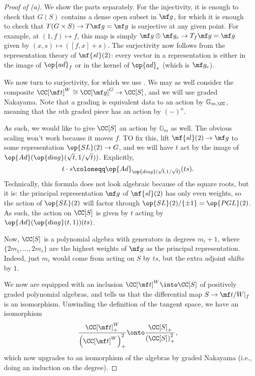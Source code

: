 \documentclass[../notes.tex]{subfiles}
\begin{document}
\begin{proof}[Proof of (a)]
	We show the parts separately. For the injectivity, it is enough to check that $G(S)$ contains a dense open subset in $\mf g$, for which it is enough to check that $T(G\times S)\to T\mf g=\mf g$ is surjective at any given point. For example, at $(1,f)\mapsto f$, this map is simply $\mf g\oplus\mf g_e\to T_f\mf g=\mf g$ given by $(x,s)\mapsto([f,x]+s)$. The surjectivity now follows from the representation theory of $\mf{sl}(2)$: every vector in a representation is either in the image of $\op{ad}_f$ or in the kernel of $\op{ad}_e$ (which is $\mf g_e$).
		
	We now turn to surjectivity, for which we use . We may as well consider the composite $\CC[\mf t]^W\cong\CC[\mf g]^G\to\CC[S]$, and we will use graded Nakayama. Note that a grading is equivalent data to an action by $\mathbb G_{m,\CC}$, meaning that the $n$th graded piece has an action by $(-)^n$.

	As such, we would like to give $\CC[S]$ an action by $\mathbb G_m$ as well. The obvious scaling won't work because it moves $f$. TO fix this, lift $\mf{sl}(2)\to\mf g$ to some representation $\op{SL}(2)\to G$, and we will have $t$ act by the image of $\op{Ad}(\op{diag}(\sqrt t,1/\sqrt t))$. Explicitly,
	\[t\cdot s\coloneqq\op{Ad}_{\op{diag}(\sqrt t,1/\sqrt t)}(ts).\]
	Technically, this formula does not look algebraic because of the square roots, but it is: the principal representation $\mf g$ of $\mf{sl}(2)$ has only even weights, so the action of $\op{SL}(2)$ will factor through $\op{SL}(2)/\{\pm1\}=\op{PGL}(2)$. As such, the action on $\CC[S]$ is given by $t$ acting by $\op{Ad}(\op{diag}(t,1))(ts)$.
	
	Now, $\CC[S]$ is a polynomial algebra with generators in degrees $m_i+1$, where $\{2m_1,\ldots,2m_r\}$ are the highest weights of $\mf g$ as the principal representation. Indeed, just $m_i$ would come from acting on $S$ by $ts$, but the extra adjoint shifts by $1$.

	We now are equipped with an inclusion $\CC[\mf t]^W\into\CC[S]$ of positively graded polynomial algebras, and  tells us that the differential map $S\to\mf t/W|_f$ is an isomorphism. Unwinding the definition of the tangent space, we have an isomorphism
	\[\frac{\CC[\mf t]^W_+}{\left(\CC[\mf t]^W\right)_+^2}\onto\frac{\CC[S]_+}{\left(\CC[S]\right)_+^2},\]
	which now upgrades to an isomorphism of the algebras by graded Nakayama (i.e., doing an induction on the degree).
\end{proof}
\end{document}
